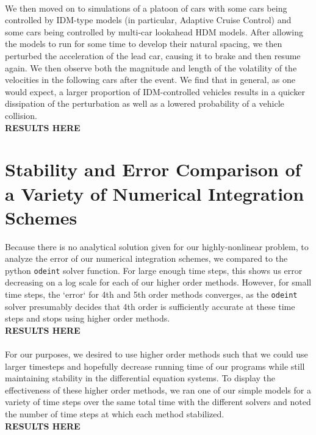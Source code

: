 \documentclass[12pt]{article}
\begin{document}


\paragraph{}We then moved on to simulations of a platoon of cars with some cars being controlled by IDM-type models (in particular, Adaptive Cruise Control) and some cars being controlled by multi-car lookahead HDM models. After allowing the models to run for some time to develop their natural spacing, we then perturbed the acceleration of the lead car, causing it to brake and then resume again. We then observe both the magnitude and length of the volatility of the velocities in the following cars after the event. We find that in general, as one would expect, a larger proportion of IDM-controlled vehicles results in a quicker dissipation of the perturbation as well as a lowered probability of a vehicle collision.\\
\textbf{RESULTS HERE}

\section{Stability and Error Comparison of a Variety of Numerical Integration Schemes}
Because there is no analytical solution given for our highly-nonlinear problem, to analyze the error of our numerical integration schemes, we compared to the python \texttt{odeint} solver function. For large enough time steps, this shows us error decreasing on a log scale for each of our higher order methods. However, for small time steps, the `error` for 4th and 5th order methods converges, as the \texttt{odeint} solver presumably decides that 4th order is sufficiently accurate at these time steps and stops using higher order methods.\\
\textbf{RESULTS HERE}
\paragraph{}For our purposes, we desired to use higher order methods such that we could use larger timesteps and hopefully decrease running time of our programs while still maintaining stability in the differential equation systems. To display the effectiveness of these higher order methods, we ran one of our simple models for a variety of time steps over the same total time with the different solvers and noted the number of time steps at which each method stabilized.\\
\textbf{RESULTS HERE}
\end{document}

